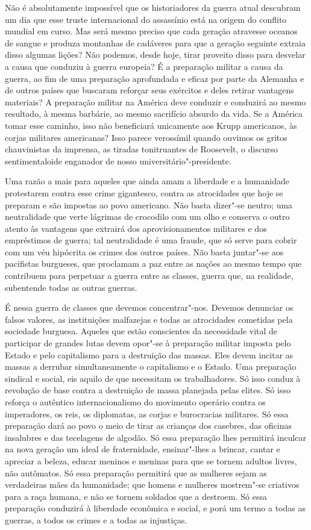 Não é absolutamente impossível que os historiadores da guerra atual
descubram um dia que esse truste internacional do assassínio está na
origem do conflito mundial em curso. Mas será mesmo preciso que cada
geração atravesse oceanos de sangue e produza montanhas de cadáveres
para que a geração seguinte extraia disso algumas lições? Não podemos,
desde hoje, tirar proveito disso para desvelar a causa que conduziu à
guerra europeia? É a preparação militar a causa da guerra, ao fim de
uma preparação aprofundada e eficaz por parte da Alemanha e de outros
países que buscaram reforçar seus exércitos e deles retirar vantagens
materiais? A preparação militar na América deve conduzir e conduzirá ao
mesmo resultado, à mesma barbárie, ao mesmo sacrifício absurdo da vida.
Se a América tomar esse caminho, isso não beneficiará unicamente aos
Krupp americanos, às corjas militares americanas? Isso parece
verossímil quando ouvimos os gritos chauvinistas da imprensa, as
tiradas tonitruantes de Roosevelt, o discurso sentimentaloide enganador
de nosso universitário"-presidente.

Uma razão a mais para aqueles que ainda amam a liberdade e a
humanidade protestarem contra esse crime gigantesco, contra as
atrocidades que hoje se preparam e são impostas ao povo americano. Não
basta dizer"-se neutro; uma neutralidade que verte lágrimas de
crocodilo com um olho e conserva o outro atento às vantagens que
extrairá dos aprovisionamentos militares e dos empréstimos de guerra;
tal neutralidade é uma fraude, que só serve para cobrir com um véu 
hipócrita os crimes dos outros países. Não basta juntar"-se aos
pacifistas burgueses, que proclamam a paz entre as nações ao mesmo
tempo que contribuem para perpetuar a guerra entre as classes, guerra
que, na realidade, subentende todas as outras guerras.

É nessa guerra de classes que devemos concentrar"-nos. Devemos
denunciar os falsos valores, as instituições malfazejas e todas as
atrocidades cometidas pela sociedade burguesa. Aqueles que estão
conscientes da necessidade vital de participar de grandes lutas devem
opor"-se à preparação militar imposta pelo Estado e pelo capitalismo
para a destruição das massas. Eles devem incitar as massas a derrubar
simultaneamente o capitalismo e o Estado. Uma preparação sindical e
social, eis aquilo de que necessitam os trabalhadores. Só isso conduz à
revolução de base contra a destruição de massa planejada pelas elites.
Só isso reforça o autêntico internacionalismo do movimento operário
contra os imperadores, os reis, os diplomatas, as corjas e burocracias
militares. Só essa preparação dará ao povo o meio de tirar as crianças
dos casebres, das oficinas insalubres e das tecelagens de algodão. Só
essa preparação lhes permitirá inculcar na nova geração um ideal de
fraternidade, ensinar"-lhes a brincar, cantar e apreciar a beleza,
educar meninos e meninas para que se tornem adultos livres, não
autômatos. Só essa preparação permitirá que as mulheres sejam as verdadeiras
mães da humanidade; que homens e mulheres mostrem"-se criativos
para a raça humana, e não se tornem soldados que a destroem. Só essa
preparação conduzirá à liberdade econômica e social, e porá um termo a
todas as guerras, a todos os crimes e a todas as injustiças.

